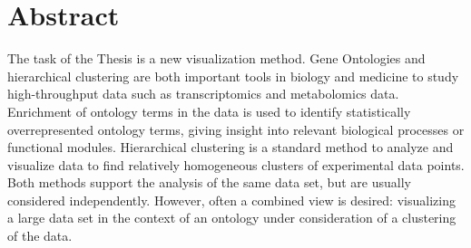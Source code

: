 \section*{Abstract}

The task of the Thesis is a new visualization method. Gene Ontologies and hierarchical clustering are both important tools in biology and medicine to study high-throughput data such as transcriptomics and metabolomics data. Enrichment of ontology terms in the data is used to identify statistically overrepresented ontology terms, giving insight into relevant biological processes or functional modules. Hierarchical clustering is a standard method to analyze and visualize data to find relatively homogeneous clusters of experimental data points. Both methods support the analysis of the same data set, but are usually considered independently. However, often a combined view is desired: visualizing a large data set in the context of an ontology under consideration of a clustering of the data.

